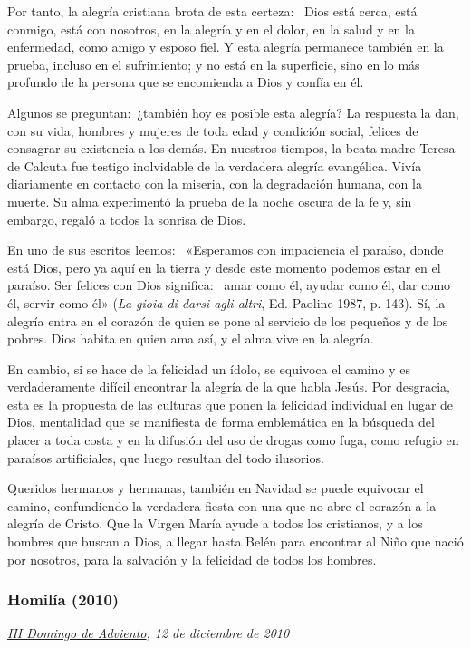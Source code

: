 Por tanto, la alegría cristiana brota de esta certeza:~ Dios está cerca,
está conmigo, está con nosotros, en la alegría y en el dolor, en la
salud y en la enfermedad, como amigo y esposo fiel. Y esta alegría
permanece también en la prueba, incluso en el sufrimiento; y no está en
la superficie, sino en lo más profundo de la persona que se encomienda a
Dios y confía en él.

Algunos se preguntan:~¿también hoy es posible esta alegría? La respuesta
la dan, con su vida, hombres y mujeres de toda edad y condición social,
felices de consagrar su existencia a los demás. En nuestros tiempos, la
beata madre Teresa de Calcuta fue testigo inolvidable de la verdadera
alegría evangélica. Vivía diariamente en contacto con la miseria, con la
degradación humana, con la muerte. Su alma experimentó la prueba de la
noche oscura de la fe y, sin embargo, regaló a todos la sonrisa de Dios.

En uno de sus escritos leemos:~ «Esperamos con impaciencia el paraíso,
donde está Dios, pero ya aquí en la tierra y desde este momento podemos
estar en el paraíso. Ser felices con Dios significa:~ amar como él,
ayudar como él, dar como él, servir como él» (\emph{La gioia di darsi
	agli altri}, Ed. Paoline 1987, p. 143). Sí, la alegría entra en el
corazón de quien se pone al servicio de los pequeños y de los pobres.
Dios habita en quien ama así, y el alma vive en la alegría.

En cambio, si se hace de la felicidad un ídolo, se equivoca el camino y
es verdaderamente difícil encontrar la alegría de la que habla Jesús.
Por desgracia, esta es la propuesta de las culturas que ponen la
felicidad individual en lugar de Dios, mentalidad que se manifiesta de
forma emblemática en la búsqueda del placer a toda costa y en la
difusión del uso de drogas como fuga, como refugio en paraísos
artificiales, que luego resultan del todo ilusorios.

Queridos hermanos y hermanas, también en Navidad se puede equivocar el
camino, confundiendo la verdadera fiesta con una que no abre el corazón
a la alegría de Cristo. Que la Virgen María ayude a todos los
cristianos, y a los hombres que buscan a Dios, a llegar hasta Belén para
encontrar al Niño que nació por nosotros, para la salvación y la
felicidad de todos los hombres.

\subsubsection{Homilía (2010)}
\emph{\href{http://www.vatican.va/liturgical_year/advent/2010/index_sp.html\#III_DOMINGO_DE_ADVIENTO}{III
		Domingo de Adviento}, 12 de diciembre de 2010}

